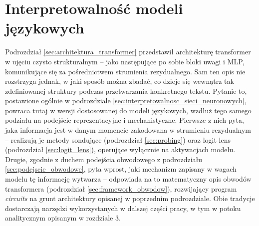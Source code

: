 \section{Interpretowalność modeli językowych}
\label{sec:interpretowalnosc_modeli_jezykowych}
Podrozdział \ref{sec:architektura_transformer} przedstawił architekturę transformer w ujęciu czysto strukturalnym -- jako następujące po sobie bloki uwagi i MLP, komunikujące się za pośrednictwem strumienia rezydualnego. Sam ten opis nie rozstrzyga jednak, w jaki sposób można zbadać, co dzieje się wewnątrz tak zdefiniowanej struktury podczas przetwarzania konkretnego tekstu. Pytanie to, postawione ogólnie w podrozdziale \ref{sec:interpretowalnosc_sieci_neuronowych}, powraca tutaj w wersji dostosowanej do modeli językowych, wzdłuż tego samego podziału na podejście reprezentacyjne i mechanistyczne. Pierwsze z nich pyta, jaka informacja jest w danym momencie zakodowana w strumieniu rezydualnym -- realizują je metody sondujące (podrozdział \ref{sec:probing}) oraz logit lens (podrozdział \ref{sec:logit_lens}), operujące wyłącznie na aktywacjach modelu. Drugie, zgodnie z duchem podejścia obwodowego z podrozdziału \ref{sec:podejscie_obwodowe}, pyta wprost, jaki mechanizm zapisany w wagach modelu tę informację wytwarza -- odpowiada na to matematyczny opis obwodów transformera (podrozdział \ref{sec:framework_obwodow}), rozwijający program \textit{circuits} na grunt architektury opisanej w poprzednim podrozdziale. Obie tradycje dostarczają narzędzi wykorzystanych w dalszej części pracy, w tym w potoku analitycznym opisanym w rozdziale 3. \newline
